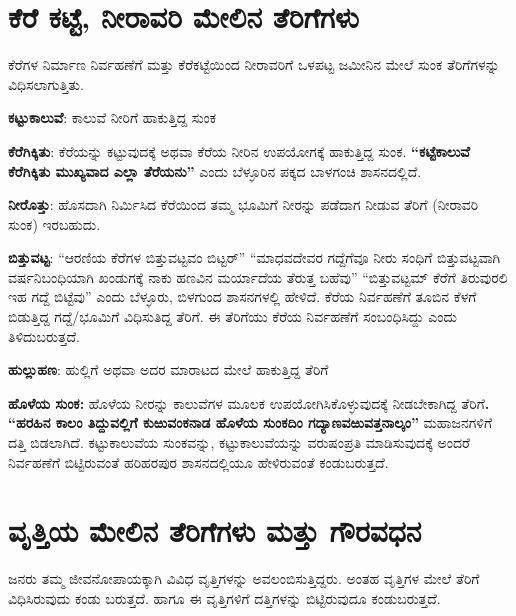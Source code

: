 \section{ಕೆರೆ ಕಟ್ಟೆ, ನೀರಾವರಿ ಮೇಲಿನ ತೆರಿಗೆಗಳು}

ಕೆರೆಗಳ ನಿರ್ಮಾಣ ನಿರ್ವಹಣೆಗೆ ಮತ್ತು ಕೆರೆಕಟ್ಟೆಯಿಂದ ನೀರಾವರಿಗೆ ಒಳಪಟ್ಟ ಜಮೀನಿನ ಮೇಲೆ ಸುಂಕ ತೆರಿಗೆಗಳನ್ನು ವಿಧಿಸಲಾಗುತ್ತಿತು.

\textbf{ಕಟ್ಟುಕಾಲುವೆ}: ಕಾಲುವೆ ನೀರಿಗೆ ಹಾಕುತ್ತಿದ್ದ ಸುಂಕ

\textbf{ಕೆರೆಗಿಕ್ಕಿತು}: ಕೆರೆಯನ್ನು ಕಟ್ಟುವುದಕ್ಕೆ ಅಥವಾ ಕೆರೆಯ ನೀರಿನ ಉಪಯೋಗಕ್ಕೆ ಹಾಕುತ್ತಿದ್ದ ಸುಂಕ. \textbf{“ಕಟ್ಟೆಕಾಲುವೆ ಕೆರೆಗಿಕ್ಕಿತು ಮುಖ್ಯವಾದ ಎಲ್ಲಾ ತೆರೆಯನು”} ಎಂದು ಬೆಳ್ಳೂರಿನ ಪಕ್ಕದ ಬಾಳಗಂಚಿ ಶಾಸನದಲ್ಲಿದೆ.

\textbf{ನೀರೊತ್ತು}: ಹೊಸದಾಗಿ ನಿರ್ಮಿಸಿದ ಕೆರೆಯಿಂದ ತಮ್ಮ ಭೂಮಿಗೆ ನೀರನ್ನು ಪಡೆದಾಗ ನೀಡುವ ತೆರಿಗೆ (ನೀರಾವರಿ ಸುಂಕ) ಇರಬಹುದು.

\textbf{ಬಿತ್ತುವಟ್ಟ}: “ಆರಣಿಯ ಕೆರೆಗಳ ಬಿತ್ತುವಟ್ಟವಂ ಬಿಟ್ಟರ್​” “ಮಾಧವದೇವರ ಗದ್ದೆಗೆವೂ ನೀರು ಸಂಧಿಗೆ ಬಿತ್ತುವಟ್ಟವಾಗಿ ವರ್ಷನಿಬಂಧಿಯಾಗಿ ಖಂಡುಗಕ್ಕೆ ನಾಕು ಹಣವಿನ ಮರ್ಯಾದೆಯ ತೆರುತ್ತ ಬಹೆವು” “ಬಿತ್ತುವಟ್ಟಮ್ ಕೆರೆಗೆ ತಿರುವುರಲಿ ಇಹ ಗದ್ದೆ ಬಿಟ್ಟೆವು” ಎಂದು ಬೆಳ್ಳೂರು, ಬಿಳಗುಂದ ಶಾಸನಗಳಲ್ಲಿ ಹೇಳಿದೆ. ಕೆರೆಯ ನಿರ್ವಹಣೆಗೆ ತೂಬಿನ ಕೆಳಗೆ ಬಿಡುತ್ತಿದ್ದ ಗದ್ದೆ/ಭೂಮಿಗೆ ವಿಧಿಸುತಿದ್ದ ತೆರಿಗೆ. ಈ ತೆರಿಗೆಯು ಕೆರೆಯ ನಿರ್ವಹಣೆಗೆ ಸಂಬಂಧಿಸಿದ್ದು ಎಂದು ತಿಳಿದುಬರುತ್ತದೆ.

\textbf{ಹುಲ್ಲುಹಣ}: ಹುಲ್ಲಿಗೆ ಅಥವಾ ಅದರ ಮಾರಾಟದ ಮೇಲೆ ಹಾಕುತ್ತಿದ್ದ ತೆರಿಗೆ

\textbf{ಹೊಳೆಯ ಸುಂಕ: } ಹೊಳೆಯ ನೀರನ್ನು ಕಾಲುವೆಗಳ ಮೂಲಕ ಉಪಯೋಗಿಸಿಕೊಳ್ಳುವುದಕ್ಕೆ ನೀಡಬೇಕಾಗಿದ್ದ ತೆರಿಗೆ\textbf{. “ಹರಹಿನ ಕಾಲಂ ತಿದ್ದುವಲ್ಲಿಗೆ ಕುಱುವಂಕನಾಡ ಹೊಳೆಯ ಸುಂಕದಿಂ ಗದ್ಯಾಣವಱುವತ್ತನಾಲ್ಕಂ” }ಮಹಾಜನಗಳಿಗೆ ದತ್ತಿ ಬಿಡಲಾಗಿದೆ. ಕಟ್ಟುಕಾಲುವೆಯ ಸುಂಕವನ್ನು, ಕಟ್ಟುಕಾಲುವೆಯನ್ನು ವರುಷಂಪ್ರತಿ ಮಾಡಿಸುವುದಕ್ಕೆ ಅಂದರೆ ನಿರ್ವಹಣೆಗೆ ಬಿಟ್ಟಿರುವಂತೆ ಹರಿಹರಪುರ ಶಾಸನದಲ್ಲಿಯೂ ಹೇಳಿರುವಂತೆ ಕಂಡುಬರುತ್ತದೆ.

\section{ವೃತ್ತಿಯ ಮೇಲಿನ ತೆರಿಗೆಗಳು ಮತ್ತು ಗೌರವಧನ}

ಜನರು ತಮ್ಮ ಜೀವನೋಪಾಯಕ್ಕಾಗಿ ವಿವಿಧ ವೃತ್ತಿಗಳನ್ನು ಅವಲಂಬಿಸುತ್ತಿದ್ದರು. ಅಂತಹ ವೃತ್ತಿಗಳ ಮೇಲೆ ತೆರಿಗೆ ವಿಧಿಸಿರುವುದು ಕಂಡು ಬರುತ್ತದೆ. ಹಾಗೂ ಈ ವೃತ್ತಿಗಳಿಗೆ ದತ್ತಿಗಳನ್ನು ಬಿಟ್ಟಿರುವುದೂ ಕಂಡುಬರುತ್ತದೆ.

